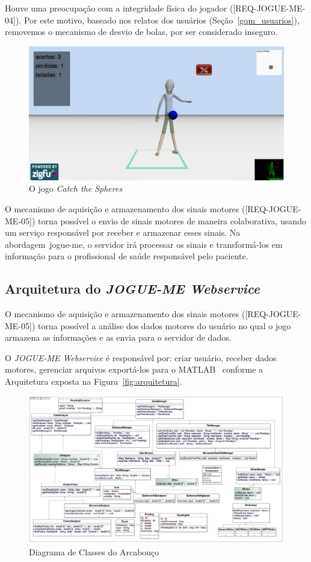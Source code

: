 Houve uma preocupação com a integridade física do jogador ([REQ-JOGUE-ME-04]). Por este motivo, baseado nos relatos dos usuários (Seção~\ref{gqm_usuarios}), removemos o mecanismo de desvio de bolas, por ser considerado inseguro.

\begin{figure}[!htb]
     \centering
     \includegraphics[width=.8\textwidth]{./img/catch-the-spheres.png}
     \caption{O jogo \emph{Catch the Spheres}}
     \label{img:catch}
\end{figure}

O mecanismo de aquisição e armazenamento dos sinais motores ([REQ-JOGUE-ME-05]) torna possível o envio de sinais motores de maneira colaborativa, usando um serviço responsável por receber e armazenar esses sinais. Na abordagem~\ac{jogue-me}, o servidor irá processar os sinais e transformá-los em informação para o profissional de saúde responsável pelo paciente.

\subsection{Arquitetura do \textit{JOGUE-ME Webservice}}
O mecanismo de aquisição e armazenamento dos sinais motores ([REQ-JOGUE-ME-05]) torna possível a análise dos dados motores do usuário no qual o jogo armazena as informações e as envia para o servidor de dados. 

O \textit{JOGUE-ME Webservice} é responsável por: criar usuário, receber dados motores, gerenciar arquivos exportá-los para o MATLAB~\cite{matlab2011} conforme a Arquitetura exposta na Figura~\ref{fig:arquitetura}.

\begin{figure}[!htb]
     \centering
     \includegraphics[width=1\textwidth]{./img/class_diagram.png}
     \caption[Diagrama de Classes do Arcabouço]{Diagrama de Classes do Arcabouço ~\cite{antonio2013}}
     \label{img:classd}
\end{figure}


